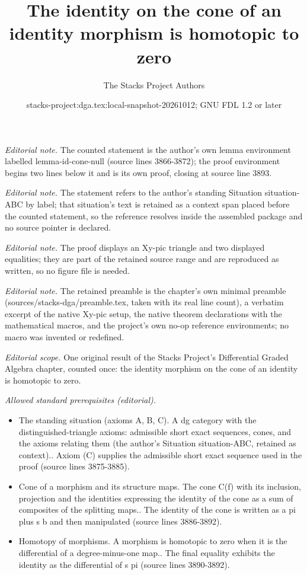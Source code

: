 \documentclass{stacks-project}
\title{The identity on the cone of an identity morphism is homotopic to zero}
\author{The Stacks Project Authors}
\date{stacks-project:dga.tex:local-snapshot-20261012; GNU FDL 1.2 or later}
\theoremstyle{plain}
\theoremstyle{definition}
\theoremstyle{remark}
\numberwithin{equation}{subsection}
\begin{document}
\maketitle
\noindent\textit{Editorial note.} The counted statement is the author's own lemma environment labelled lemma-id-cone-null (source lines 3866-3872); the proof environment begins two lines below it and is its own proof, closing at source line 3893.\par\medskip
\noindent\textit{Editorial note.} The statement refers to the author's standing Situation situation-ABC by label; that situation's text is retained as a context span placed before the counted statement, so the reference resolves inside the assembled package and no source pointer is declared.\par\medskip
\noindent\textit{Editorial note.} The proof displays an Xy-pic triangle and two displayed equalities; they are part of the retained source range and are reproduced as written, so no figure file is needed.\par\medskip
\noindent\textit{Editorial note.} The retained preamble is the chapter's own minimal preamble (sources/stacks-dga/preamble.tex, taken with its real line count), a verbatim excerpt of the native Xy-pic setup, the native theorem declarations with the mathematical macros, and the project's own no-op reference environments; no macro was invented or redefined.\par\medskip
\noindent\textit{Editorial scope.} One original result of the Stacks Project's Differential Graded Algebra chapter, counted once: the identity morphism on the cone of an identity is homotopic to zero.\par\medskip
\noindent\textit{Allowed standard prerequisites (editorial).}\begin{itemize}
\item The standing situation (axioms A, B, C). A dg category with the distinguished-triangle axioms: admissible short exact sequences, cones, and the axioms relating them (the author's Situation situation-ABC, retained as context).. Axiom (C) supplies the admissible short exact sequence used in the proof (source lines 3875-3885).
\item Cone of a morphism and its structure maps. The cone C(f) with its inclusion, projection and the identities expressing the identity of the cone as a sum of composites of the splitting maps.. The identity of the cone is written as a pi plus s b and then manipulated (source lines 3886-3892).
\item Homotopy of morphisms. A morphism is homotopic to zero when it is the differential of a degree-minus-one map.. The final equality exhibits the identity as the differential of s pi (source lines 3890-3892).
\end{itemize}\medskip
\end{document}
